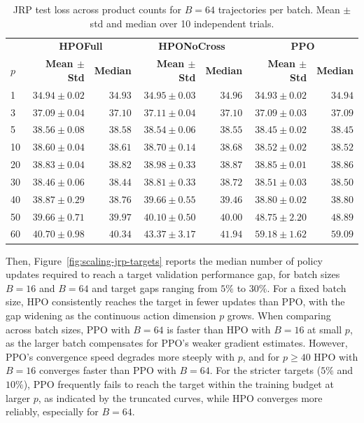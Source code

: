 \documentclass{article}
\theoremstyle{definition}
\theoremstyle{remark}
\begin{document}
\begin{table}[ht]
  \centering
  \small
  \caption{JRP test loss across product counts for $B=64$ trajectories per batch. Mean $\pm$ std and median over 10 independent trials.}
  \label{tab:jrp-results-64}
  \begin{tabular}{lrrrrrr}
    \toprule
     & \multicolumn{2}{c}{\textbf{HPOFull}} & \multicolumn{2}{c}{\textbf{HPONoCross}} & \multicolumn{2}{c}{\textbf{PPO}} \\
    \cmidrule(lr){2-3} \cmidrule(lr){4-5} \cmidrule(lr){6-7}
    \textbf{$p$} & \textbf{Mean $\pm$ Std} & \textbf{Median} & \textbf{Mean $\pm$ Std} & \textbf{Median} & \textbf{Mean $\pm$ Std} & \textbf{Median} \\
    \midrule
    1 & $34.94 \pm 0.02$ & $34.93$ & $34.95 \pm 0.03$ & $34.96$ & $34.93 \pm 0.02$ & $34.94$ \\
    3 & $37.09 \pm 0.04$ & $37.10$ & $37.11 \pm 0.04$ & $37.10$ & $37.09 \pm 0.03$ & $37.09$ \\
    5 & $38.56 \pm 0.08$ & $38.58$ & $38.54 \pm 0.06$ & $38.55$ & $38.45 \pm 0.02$ & $38.45$ \\
    10 & $38.60 \pm 0.04$ & $38.61$ & $38.70 \pm 0.14$ & $38.68$ & $38.52 \pm 0.02$ & $38.52$ \\
    20 & $38.83 \pm 0.04$ & $38.82$ & $38.98 \pm 0.33$ & $38.87$ & $38.85 \pm 0.01$ & $38.86$ \\
    30 & $38.46 \pm 0.06$ & $38.44$ & $38.81 \pm 0.33$ & $38.72$ & $38.51 \pm 0.03$ & $38.50$ \\
    40 & $38.87 \pm 0.29$ & $38.76$ & $39.66 \pm 0.55$ & $39.46$ & $38.80 \pm 0.02$ & $38.80$ \\
    50 & $39.66 \pm 0.71$ & $39.97$ & $40.10 \pm 0.50$ & $40.00$ & $48.75 \pm 2.20$ & $48.89$ \\
    60 & $40.70 \pm 0.98$ & $40.34$ & $43.37 \pm 3.17$ & $41.94$ & $59.18 \pm 1.62$ & $59.09$ \\
    \bottomrule
  \end{tabular}
\end{table}

Then, Figure~\ref{fig:scaling-jrp-targets} reports the median number of policy updates required to reach a target validation performance gap, for batch sizes $B = 16$ and $B = 64$ and target gaps ranging from $5\%$ to $30\%$. For a fixed batch size, HPO consistently reaches the target in fewer updates than PPO, with the gap widening as the continuous action dimension $p$ grows. When comparing across batch sizes, PPO with $B = 64$ is faster than HPO with $B = 16$ at small $p$, as the larger batch compensates for PPO's weaker gradient estimates. However, PPO's convergence speed degrades more steeply with $p$, and for $p\geq 40$ HPO with $B = 16$ converges faster than PPO with $B = 64$. For the stricter targets ($5\%$ and $10\%$), PPO frequently fails to reach the target within the training budget at larger $p$, as indicated by the truncated curves, while HPO converges more reliably, especially for $B=64$.
\end{document}

